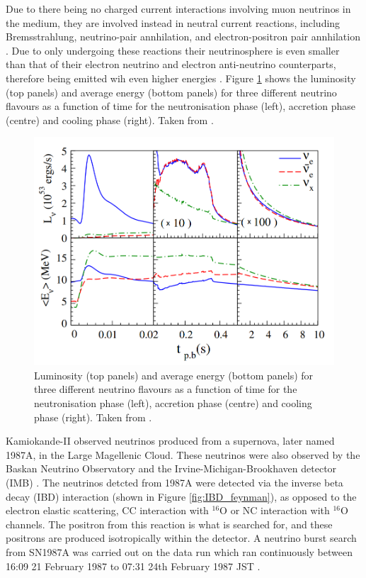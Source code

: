 Due to there being no charged current interactions involving muon neutrinos in the medium, they are involved instead in neutral current reactions, including Bremsstrahlung, neutrino-pair annhilation, and electron-positron pair annhilation \cite{betranhandy2020impact}. Due to only undergoing these reactions their neutrinosphere is even smaller than that of their electron neutrino and electron anti-neutrino counterparts, therefore being emitted wih even higher energies \cite{nagakura_non-thermal_2021}. Figure \ref{fig:ccsn_nu_flavor_energy} shows the luminosity (top panels) and average energy (bottom panels) for three different neutrino flavours as a function of time for the neutronisation phase (left), accretion phase (centre) and cooling phase (right). Taken from \cite{chakraborty_observing_2014}.

\begin{figure}
    \includegraphics[width=\textwidth]{Figures/ccsn_nu_flavor_energy.png}
    \caption{Luminosity (top panels) and average energy (bottom panels) for three different neutrino flavours as a function of time for the neutronisation phase (left), accretion phase (centre) and cooling phase (right). Taken from \cite{chakraborty_observing_2014}. }
    \label{fig:ccsn_nu_flavor_energy}
\end{figure}



Kamiokande-II observed neutrinos produced from a supernova, later named 1987A, in the Large Magellenic Cloud. These neutrinos were also observed by the Baskan Neutrino Observatory and the Irvine-Michigan-Brookhaven detector (IMB) \cite{hirata_observation_1987}. The neutrinos detcted from 1987A were detected via the inverse beta decay (IBD) interaction (shown in Figure \ref{fig:IBD_feynman}), as opposed to the electron elastic scattering, CC interaction with ${ }^{16} \mathrm{O}$ or NC interaction with  ${ }^{16} \mathrm{O}$ channels. The positron from this reaction is what is searched for, and these positrons are produced isotropically within the detector. A neutrino burst search from SN1987A was carried out on the data run which ran continuously between 16:09 21 February 1987 to 07:31 24th February 1987 JST \cite{Hirata:1988ad}.

